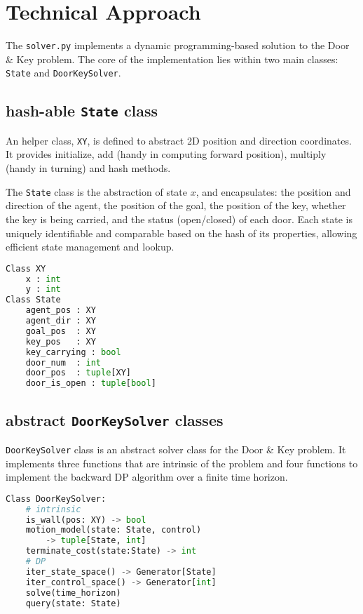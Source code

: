 \documentclass[conference]{IEEEtran}
\begin{document}
\section{Technical Approach}

The \texttt{solver.py} implements a dynamic programming-based solution 
to the Door \& Key problem.
The core of the implementation lies within two main classes: 
\texttt{State} and \texttt{DoorKeySolver}.

\subsection{hash-able \texttt{State} class}
An helper class, \texttt{XY}, is defined to abstract 2D position and direction coordinates.
It provides initialize, add (handy in computing forward position), 
multiply (handy in turning) and hash methods. 

The \texttt{State} class is the abstraction of state $x$,
and encapsulates: the position and direction of the agent, 
the position of the goal,
the position of the key, whether the key is being carried, 
and the status (open/closed) of each door.
Each state is uniquely identifiable and comparable based on the hash of its properties, 
allowing efficient state management and lookup.

\begin{lstlisting}[language=python]
Class XY
    x : int
    y : int
Class State
    agent_pos : XY
    agent_dir : XY
    goal_pos  : XY
    key_pos   : XY
    key_carrying : bool
    door_num  : int
    door_pos  : tuple[XY]
    door_is_open : tuple[bool]
\end{lstlisting}

\subsection{abstract \texttt{DoorKeySolver} classes}
\texttt{DoorKeySolver} class is an abstract solver class for the Door \& Key problem.
It implements three functions that are intrinsic of the problem
and four functions to implement the backward DP algorithm over a finite time horizon.
\begin{lstlisting}[language=python]
Class DoorKeySolver:
    # intrinsic
    is_wall(pos: XY) -> bool
    motion_model(state: State, control) 
        -> tuple[State, int]
    terminate_cost(state:State) -> int
    # DP
    iter_state_space() -> Generator[State]
    iter_control_space() -> Generator[int]
    solve(time_horizon)
    query(state: State)
\end{lstlisting}
\end{document}
